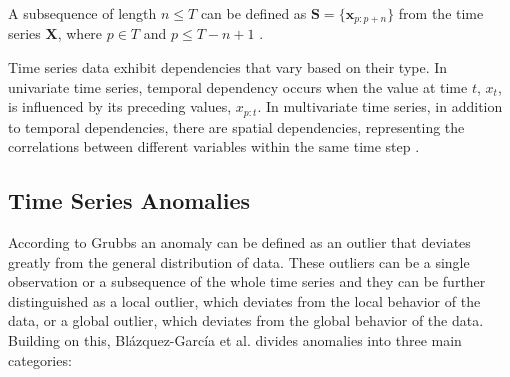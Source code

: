 A subsequence of length $n \leq T$ can be defined as $\textbf{S} = \{\textbf{x}_{p:p+n}\}$ from the time series $\textbf{X}$, where $p \in T$ and $p \leq T-n+1$ \cite{Blazquez-Garcia_Conde_Mori_Lozano_2021}. 

Time series data exhibit dependencies that vary based on their type. In univariate time series, temporal dependency occurs when the value at time $t$, $x_t$, is influenced by its preceding values, $x_{p:t}$. In multivariate time series, in addition to temporal dependencies, there are spatial dependencies, representing the correlations between different variables within the same time step \cite{Zamanzadeh_Darban_Webb_Pan_Aggarwal_Salehi_2024}.

\subsection{Time Series Anomalies}

According to Grubbs \cite{Grubbs_1969} an anomaly can be defined as an outlier that deviates greatly from the general distribution of data. These outliers can be a single observation or a subsequence of the whole time series and they can be further distinguished as a local outlier, which deviates from the local behavior of the data, or a global outlier, which deviates from the global behavior of the data. Building on this, Blázquez-García et al. \cite{Blazquez-Garcia_Conde_Mori_Lozano_2021} divides anomalies into three main categories:

